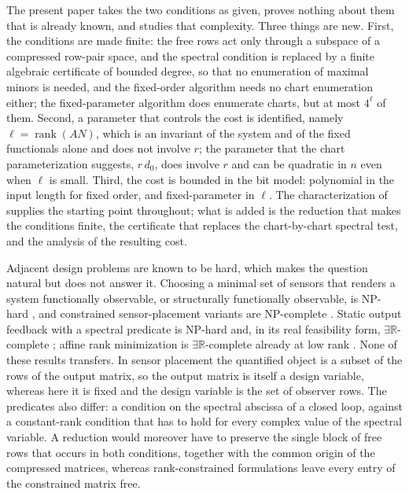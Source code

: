 \documentclass[journal]{IEEEtran}
\theoremstyle{plainn}
\theoremstyle{remark}
\begin{document}
The present paper takes the two conditions as given, proves nothing about them that is already
known, and studies that complexity. Three things are new. First, the conditions are made
finite: the free rows act only through a subspace of a compressed row-pair space, and the
spectral condition is replaced by a finite algebraic certificate of bounded degree, so that no
enumeration of maximal minors is needed, and the fixed-order algorithm needs no chart enumeration
either; the fixed-parameter algorithm does enumerate charts, but at most $4^{\ell}$ of them. Second, a parameter that
controls the cost is identified, namely $\ell=\operatorname{rank}(AN)$, which is an invariant
of the system and of the fixed functionals alone and does not involve $r$; the parameter that
the chart parameterization suggests, $r\,d_0$, does involve $r$ and can be quadratic in $n$
even when $\ell$ is small. Third, the cost is bounded in the bit model: polynomial in the input
length for fixed order, and fixed-parameter in $\ell$. The characterization of
\cite{fer10,dar25,fer26a,fer26b} supplies the starting point throughout; what is added is the
reduction that makes the conditions finite, the certificate that replaces the chart-by-chart
spectral test, and the analysis of the resulting cost.

Adjacent design problems are known to be hard, which makes the question natural but does
not answer it. Choosing a minimal set of sensors that renders a system functionally
observable, or structurally functionally observable, is NP-hard \cite{zha25}, and
constrained sensor-placement variants are NP-complete \cite{dey21}. Static output
feedback with a spectral predicate is NP-hard \cite{lof26,bar26} and, in its real
feasibility form, $\exists\mathbb R$-complete \cite{liu26}; affine rank minimization is
$\exists\mathbb R$-complete already at low rank \cite{maj26}. None of these results
transfers. In sensor placement the quantified object is a subset of the rows of the
output matrix, so the output matrix is itself a design variable, whereas here it is fixed
and the design variable is the set of observer rows. The predicates also differ: a
condition on the spectral abscissa of a closed loop, against a constant-rank condition
that has to hold for every complex value of the spectral variable. A reduction would
moreover have to preserve the single block of free rows that occurs in both conditions,
together with the common origin of the compressed matrices, whereas rank-constrained
formulations leave every entry of the constrained matrix free.
\end{document}
